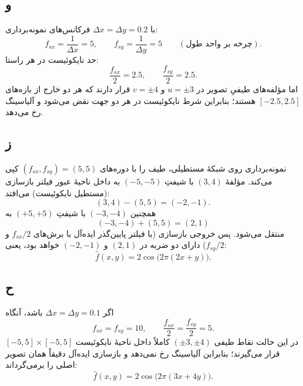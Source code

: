 \subsection*{و}
با
$\Delta x=\Delta y=0.2$
فرکانس‌های نمونه‌برداری:
\[
f_{sx}=\frac{1}{\Delta x}=5,\qquad
f_{sy}=\frac{1}{\Delta y}=5 \qquad (\text{چرخه بر واحد طول}).
\]
حد نایکوئیست در هر راستا:
\[
\frac{f_{sx}}{2}=2.5,\qquad \frac{f_{sy}}{2}=2.5.
\]
اما مؤلفه‌های طیفیِ تصویر در
$u=\pm 3$
و
$v=\pm 4$
قرار دارند که هر دو خارج از بازه‌های
$[-2.5,2.5]$
هستند؛ بنابراین شرط نایکوئیست در هر دو جهت نقض می‌شود و آلیاسینگ رخ می‌دهد.

\subsection*{ز}
نمونه‌برداری روی شبکهٔ مستطیلی، طیف را با دوره‌های
$(f_{sx},f_{sy})=(5,5)$
کپی می‌کند. مؤلفهٔ
$(3,4)$
با شیفتِ
$(-5,-5)$
به داخل ناحیهٔ عبور فیلتر بازسازی (مستطیل نایکوئیست) می‌افتد:
\[
(3,4)-(5,5)=(-2,-1).
\]
همچنین
$(-3,-4)$
با شیفتِ
$(+5,+5)$
به
\[
(-3,-4)+(5,5)=(2,1)
\]
منتقل می‌شود. پس خروجی بازسازی (با فیلتر پایین‌گذر ایده‌آل با برش‌های
$f_{sx}/2$
و
$f_{sy}/2$)
دارای دو ضربه در
$(2,1)$
و
$(-2,-1)$
خواهد بود، یعنی:
\[
\hat f(x,y)=2\cos\big(2\pi(2x+y)\big).
\]

\subsection*{ح}
اگر
$\Delta x=\Delta y=0.1$
باشد، آنگاه
\[
f_{sx}=f_{sy}=10,\qquad \frac{f_{sx}}{2}=\frac{f_{sy}}{2}=5.
\]
در این حالت نقاط طیفی
$(\pm 3,\pm 4)$
کاملاً داخل ناحیهٔ نایکوئیست
$[-5,5]\times[-5,5]$
قرار می‌گیرند؛ بنابراین آلیاسینگ رخ نمی‌دهد و بازسازی ایده‌آل دقیقاً همان تصویر اصلی را برمی‌گرداند:
\[
\hat f(x,y)=2\cos\big(2\pi(3x+4y)\big).
\]